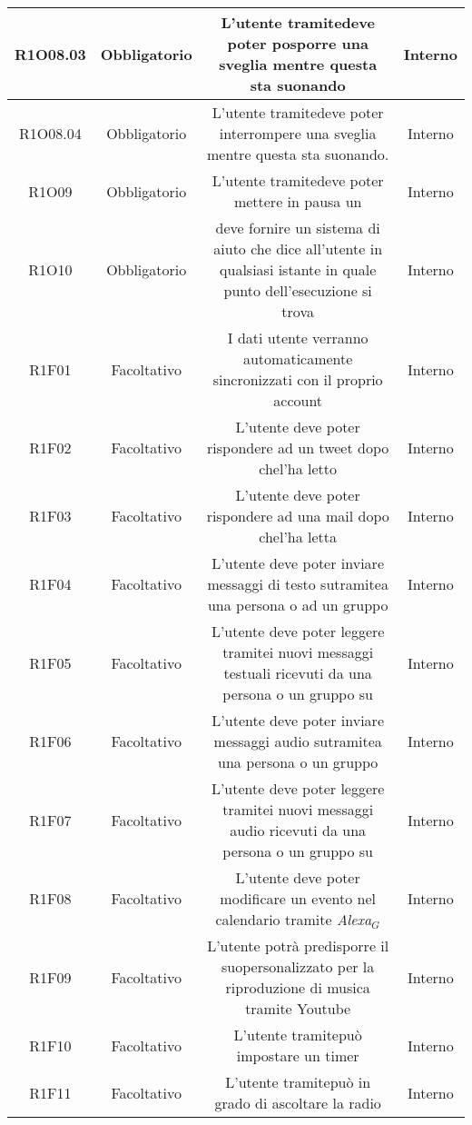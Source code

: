 \begin{tabularx}{\textwidth}{|C|C|C|C|}
	\hline
	R1O08.03 & Obbligatorio & L'utente tramitedeve poter posporre una sveglia mentre questa sta suonando &Interno\\
	\hline	
	R1O08.04 & Obbligatorio & L'utente tramitedeve poter interrompere una sveglia mentre questa sta suonando. &Interno\\
	\hline
	R1O09& Obbligatorio  &L'utente tramitedeve poter mettere in pausa un &Interno \\
	\hline
	R1O10& Obbligatorio&deve fornire un sistema di aiuto che dice all'utente in qualsiasi istante in quale punto dell'esecuzione si trova & Interno\\
	\hline
	R1F01 & Facoltativo & I dati utente verranno automaticamente sincronizzati con il proprio account & Interno\\
	\hline
	R1F02 & Facoltativo & L'utente deve poter rispondere ad un tweet dopo chel'ha letto & Interno\\
	\hline
	R1F03 & Facoltativo & L'utente deve poter rispondere ad una mail dopo chel'ha letta & Interno\\
	\hline
	R1F04 & Facoltativo & L'utente deve poter inviare messaggi di testo sutramitea una persona o ad un gruppo & Interno\\
	\hline
	R1F05 & Facoltativo & L'utente deve poter leggere tramitei nuovi messaggi testuali ricevuti da una persona o un gruppo su  & Interno\\
	\hline
	R1F06 & Facoltativo & L'utente deve poter inviare messaggi audio sutramitea una persona o un gruppo  & Interno\\
	\hline
	R1F07 & Facoltativo & L'utente deve poter leggere tramitei nuovi messaggi audio ricevuti da una persona o un gruppo su   & Interno\\
	\hline
	R1F08 & Facoltativo & L'utente deve poter modificare un evento nel calendario tramite \textit{Alexa$_{G}$} & Interno\\
	\hline
	R1F09 & Facoltativo & L'utente potrà predisporre il suopersonalizzato per la riproduzione di musica tramite Youtube & Interno\\
	\hline
	R1F10& Facoltativo  &L'utente tramitepuò impostare un timer &Interno \\
	\hline
	R1F11& Facoltativo  &L'utente tramitepuò in grado di ascoltare la radio &Interno \\

\end{tabularx}
